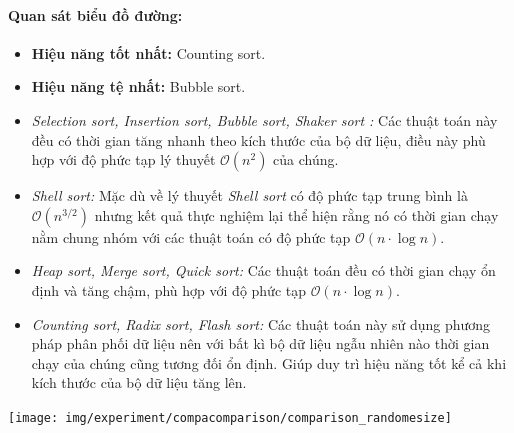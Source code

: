     \paragraph{Quan sát biểu đồ đường:}
    \begin{itemize}
        \item \textbf{Hiệu năng tốt nhất:} Counting sort.
        \item \textbf{Hiệu năng tệ nhất:} Bubble sort.
        \item \textit{Selection sort, Insertion sort, Bubble sort, Shaker sort :} Các thuật toán này đều có thời gian tăng nhanh theo kích thước của bộ dữ liệu, điều này phù hợp với độ phức tạp lý thuyết $\mathcal{O}(n^2)$ của chúng.
        \item \textit{Shell sort:} Mặc dù về lý thuyết \textit{Shell sort} có độ phức tạp trung bình là $\mathcal{O}(n^{3/2})$ nhưng kết quả thực nghiệm lại thể hiện rằng nó có thời gian chạy nằm chung nhóm với các thuật toán có độ phức tạp $\mathcal{O}(n \cdot \log n)$. 
        \item \textit{Heap sort, Merge sort, Quick sort:} Các thuật toán đều có thời gian chạy ổn định và tăng chậm, phù hợp với độ phức tạp $\mathcal{O}(n \cdot \log n)$.
        \item \textit{Counting sort, Radix sort, Flash sort:} Các thuật toán này sử dụng phương pháp phân phối dữ liệu nên với bất kì bộ dữ liệu ngẫu nhiên nào thời gian chạy của chúng cũng tương đối ổn định. Giúp duy trì hiệu năng tốt kể cả khi kích thước của bộ dữ liệu tăng lên.
    \end{itemize}

    \texttt{[image: img/experiment/compacomparison/comparison\_randomesize]}
\newpage
